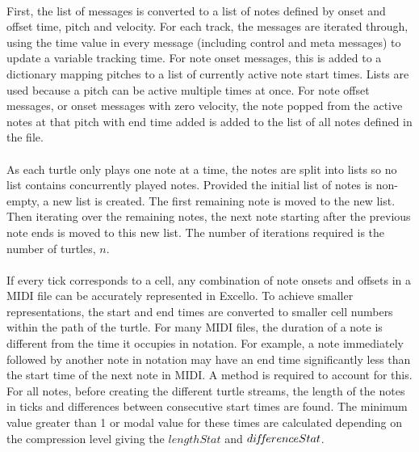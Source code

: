 \paragraph{} First, the list of messages is converted to a list of notes defined by onset and offset time, pitch and velocity. For each track, the messages are iterated through, using the time value in every message (including control and meta messages) to update a variable tracking time. For note onset messages, this is added to a dictionary mapping pitches to a list of currently active note start times. Lists are used because a pitch can be active multiple times at once. For note offset messages, or onset messages with zero velocity, the note popped from the active notes at that pitch with end time added is added to the list of all notes defined in the file.

\paragraph{} As each turtle only plays one note at a time, the notes are split into lists so no list contains concurrently played notes. Provided the initial list of notes is non-empty, a new list is created. The first remaining note is moved to the new list. Then iterating over the remaining notes, the next note starting after the previous note ends is moved to this new list. The number of iterations required is the number of turtles, $n$.

\paragraph{} If every tick corresponds to a cell, any combination of note onsets and offsets in a MIDI file can be accurately represented in Excello. To achieve smaller representations, the start and end times are converted to smaller cell numbers within the path of the turtle. For many MIDI files, the duration of a note is different from the time it occupies in notation. For example, a note immediately followed by another note in notation may have an end time significantly less than the start time of the next note in MIDI. A method is required to account for this. For all notes, before creating the different turtle streams, the length of the notes in ticks and differences between consecutive start times are found. The minimum value greater than 1 or modal value for these times are calculated depending on the compression level giving the $lengthStat$ and $di\hspace{-0.1em}f\hspace{-0.2em}f\hspace{-0.1em}erenceStat$.
\vspace{-10pt}

